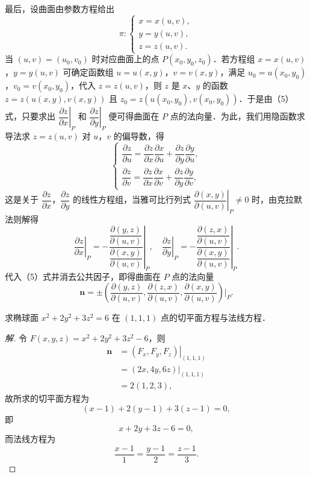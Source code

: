 最后，设曲面由参数方程给出
\[
\pi\colon\begin{cases}
x=x(u,v),\\
y=y(u,v),\\
z=z(u,v).
\end{cases}
\]
当 $(u,v)=(u_{0},v_{0})$ 时对应曲面上的点 $P(x_{0},y_{0},z_{0})$．若方程组 $x=x(u,v)$，$y=y(u,v)$ 可确定函数组 $u=u(x,y)$，$v=v(x,y)$，满足 $u_{0}=u(x_{0},y_{0})$，$v_{0}=v(x_{0},y_{0})$，代入 $z=z(u,v)$，则 $z$ 是 $x$、$y$ 的函数 $z=z(u(x,y),v(x,y))$ 且 $z_{0}=z(u(x_{0},y_{0}),v(x_{0},y_{0}))$．于是由（5）式，只要求出 $\left.\dfrac{\partial z}{\partial x}\right|_{P}$ 和 $\left.\dfrac{\partial z}{\partial y}\right|_{P}$ 便可得曲面在 $P$ 点的法向量．为此，我们用隐函数求导法求 $z=z(u,v)$ 对 $u$，$v$ 的偏导数，得
\[
\begin{cases}
\dfrac{\partial z}{\partial u}=\dfrac{\partial z}{\partial x}\dfrac{\partial x}{\partial u}+\dfrac{\partial z}{\partial y}\dfrac{\partial y}{\partial u},\\[8pt]
\dfrac{\partial z}{\partial v}=\dfrac{\partial z}{\partial x}\dfrac{\partial x}{\partial v}+\dfrac{\partial z}{\partial y}\dfrac{\partial y}{\partial v},
\end{cases}
\]
这是关于 $\dfrac{\partial z}{\partial x}$，$\dfrac{\partial z}{\partial y}$ 的线性方程组，当雅可比行列式 $\left.\dfrac{\partial(x,y)}{\partial(u,v)}\right|_{P}\neq 0$ 时，由克拉默法则解得
\[
\left.\frac{\partial z}{\partial x}\right|_{P}=-\left.\frac{\dfrac{\partial(y,z)}{\partial(u,v)}}{\dfrac{\partial(x,y)}{\partial(u,v)}}\right|_{P},\quad \left.\frac{\partial z}{\partial y}\right|_{P}=-\left.\frac{\dfrac{\partial(z,x)}{\partial(u,v)}}{\dfrac{\partial(x,y)}{\partial(u,v)}}\right|_{P}.
\]
代入（5）式并消去公共因子，即得曲面在 $P$ 点的法向量
\begin{equation}
\bm{n}=\pm\left(\frac{\partial(y,z)}{\partial(u,v)},\frac{\partial(z,x)}{\partial(u,v)},\frac{\partial(x,y)}{\partial(u,v)}\right)\bigg|_{P}.
\tag{6}
\end{equation}

\begin{example}\label{ex:16-3-2}
求椭球面 $x^{2}+2y^{2}+3z^{2}=6$ 在 $(1,1,1)$ 点的切平面方程与法线方程．
\end{example}

\begin{proof}[解]
令 $F(x,y,z)=x^{2}+2y^{2}+3z^{2}-6$，则
\[
\begin{aligned}
\bm{n}&=\left.(F_{x},F_{y},F_{z})\right|_{(1,1,1)}\\
&=\left.(2x,4y,6z)\right|_{(1,1,1)}\\
&=2(1,2,3),
\end{aligned}
\]
故所求的切平面方程为
\[
(x-1)+2(y-1)+3(z-1)=0,
\]
即
\[
x+2y+3z-6=0,
\]
而法线方程为
\[
\frac{x-1}{1}=\frac{y-1}{2}=\frac{z-1}{3}.
\]
\end{proof}

